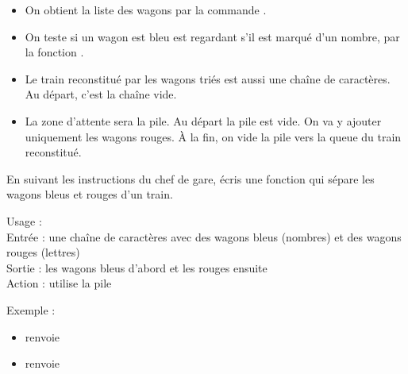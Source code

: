 \documentclass[11pt,class=report,crop=false]{standalone}
\begin{document}
\begin{activite}
\begin{itemize}
  \item On obtient la liste des wagons par la commande .
  
  \item On teste si un wagon est bleu est regardant s'il est marqué d'un nombre, par la fonction .
  
  \item Le train reconstitué par les wagons triés est aussi une chaîne de caractères. Au départ, c'est la chaîne vide.
  
  \item La zone d'attente sera la pile. Au départ la pile est vide. On va y ajouter uniquement les wagons rouges. À la fin, on vide la pile vers la queue du train reconstitué.
\end{itemize}


En suivant les instructions du chef de gare, écris une fonction  qui sépare les wagons bleus et rouges d'un train.


\begin{fonction}
  Usage :  \\
  Entrée : une chaîne de caractères avec des wagons bleus (nombres) et des wagons rouges (lettres) \\
  Sortie : les wagons bleus d'abord et les rouges ensuite \\
  Action : utilise la pile
  
  \medskip
    
  Exemple : 
  \begin{itemize}
    \item {} renvoie 
    \item {} renvoie 
    \end{itemize}
    
\end{fonction}

\end{activite}

\end{document}
